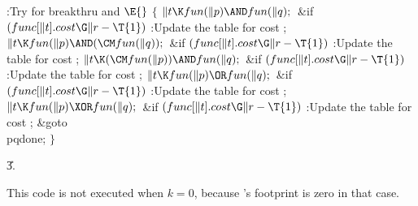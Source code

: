 \B{}:Try for breakthru and \X${}%
\E{}$\6
${}\{{}$\1\6
${}\|t\K\\{fun}(\|p)\AND\\{fun}(\|q);{}$\6
\&{if} ${}(\\{func}[\|t].\\{cost}\G\|r-\T{1}){}$\1\5
:Update the table for cost \X;\2\6
${}\|t\K\\{fun}(\|p)\AND(\CM\\{fun}(\|q));{}$\6
\&{if} ${}(\\{func}[\|t].\\{cost}\G\|r-\T{1}){}$\1\5
:Update the table for cost \X;\2\6
${}\|t\K(\CM\\{fun}(\|p))\AND\\{fun}(\|q);{}$\6
\&{if} ${}(\\{func}[\|t].\\{cost}\G\|r-\T{1}){}$\1\5
:Update the table for cost \X;\2\6
${}\|t\K\\{fun}(\|p)\OR\\{fun}(\|q);{}$\6
\&{if} ${}(\\{func}[\|t].\\{cost}\G\|r-\T{1}){}$\1\5
:Update the table for cost \X;\2\6
${}\|t\K\\{fun}(\|p)\XOR\\{fun}(\|q);{}$\6
\&{if} ${}(\\{func}[\|t].\\{cost}\G\|r-\T{1}){}$\1\5
:Update the table for cost \X;\2\6
\&{goto} \\{pqdone};\6
\4${}\}{}$\2\par
\U3.\fi

This code is not executed when $k=0$, because 's
footprint is zero
in that case.

